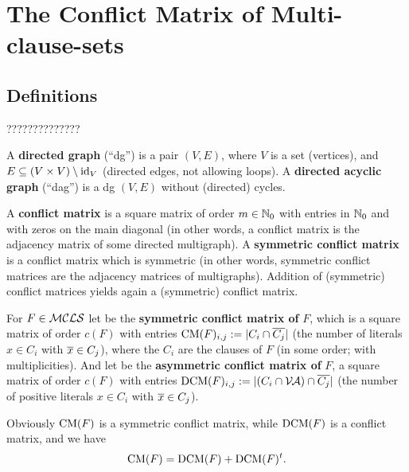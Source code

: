 \documentclass[12pt]{book}
\begin{document}

\chapter{The Conflict Matrix of Multi-clause-sets}
\label{cha:The Conflict Matrix of Multi-clause-sets}
\section{Definitions}
\label{sec:Definitions}

??????????????

\begin{defi}\label{def:dag}
      A \textbf{directed graph} (``dg'') is a pair $(V,E)$, where $V$ is a set (vertices), and $E \subseteq (V \times V) \setminus \operatorname{id}_V$ 
	  (directed edges, not allowing loops). A \textbf{directed acyclic graph} (``dag'') is a dg $(V,E)$ without (directed) cycles.
\end{defi}


\begin{defi}\label{def:conflictmat}
A \textbf{conflict matrix} is a square matrix of order $m \in \mathbb{N}_0$ with entries in $\mathbb{N}_0$ and with zeros on the main diagonal 
(in other words, a conflict matrix is the adjacency matrix of some directed multigraph). A \textbf{symmetric conflict matrix} 
is a conflict matrix which is symmetric (in other words, symmetric conflict matrices are the adjacency matrices of multigraphs). 
Addition of (symmetric) conflict matrices yields again a (symmetric) conflict matrix.

 For $F \in \mathcal{M}\mathcal{CLS}$ let  be the \textbf{symmetric conflict matrix of} $F$, which is a square matrix of order $c(F)$ 
 with entries $\operatorname{CM}(F)_{i,j} := \lvert C_i \cap \overline{C_j} \rvert$ (the number of literals $x \in C_i$ with $\overline{x} \in C_j$), where the 
 $C_i$ are the clauses of $F$ (in some order; with multiplicities). And let  be the \textbf{asymmetric conflict matrix 
 of} $F$, a square matrix of order $c(F)$ with entries $\operatorname{DCM}(F)_{i,j} := \lvert (C_i \cap \mathcal{V\hspace{-0.1em}A}) \cap \overline{C_j} \rvert$ (the number of positive 
 literals $x \in C_i$ with $\overline{x} \in C_j$)\cite{h14}.
\end{defi}
 Obviously $\operatorname{CM}(F)$ is a symmetric conflict matrix, while $\operatorname{DCM}(F)$ is a conflict matrix, and we have \cite{h14}
\begin{displaymath}
  \operatorname{CM}(F) = \operatorname{DCM}(F) + \operatorname{DCM}(F)^t.
\end{displaymath}
\end{document}
